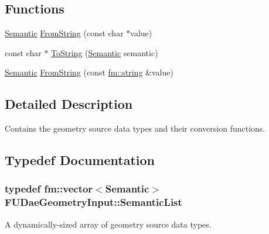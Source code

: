 \subsection*{Functions}
\begin{DoxyCompactItemize}
\item 
\hyperlink{namespaceFUDaeGeometryInput_a0f887d29f54b10338ebcf73789a7a061}{Semantic} \hyperlink{namespaceFUDaeGeometryInput_aa7fc76fb0ae396ca3ec28b2e90ff97e9}{FromString} (const char $\ast$value)
\item 
const char $\ast$ \hyperlink{namespaceFUDaeGeometryInput_a782866990c13f5b71e2927efb80e61b6}{ToString} (\hyperlink{namespaceFUDaeGeometryInput_a0f887d29f54b10338ebcf73789a7a061}{Semantic} semantic)
\item 
\hyperlink{namespaceFUDaeGeometryInput_a0f887d29f54b10338ebcf73789a7a061}{Semantic} \hyperlink{namespaceFUDaeGeometryInput_a7d3985d666f6aa3f336e6e4626ca142d}{FromString} (const \hyperlink{classfm_1_1stringT}{fm::string} \&value)
\end{DoxyCompactItemize}


\subsection{Detailed Description}
Contains the geometry source data types and their conversion functions. 

\subsection{Typedef Documentation}
\hypertarget{namespaceFUDaeGeometryInput_a06daf7a576c27d3f2ee39c59fc63498c}{
\subsubsection[{SemanticList}]{\setlength{\rightskip}{0pt plus 5cm}typedef {\bf fm::vector}$<${\bf Semantic}$>$ {\bf FUDaeGeometryInput::SemanticList}}}
\label{namespaceFUDaeGeometryInput_a06daf7a576c27d3f2ee39c59fc63498c}
A dynamically-\/sized array of geometry source data types. 

